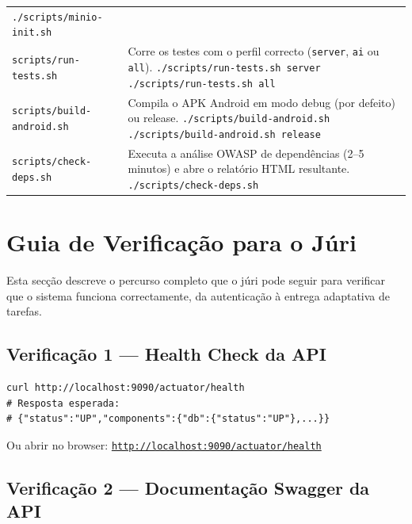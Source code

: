 \documentclass[12pt,a4paper]{article}
\newcommand{\cmd}[1]{\texttt{\small\color{accent}#1}}
\begin{document}
\begin{center}
\begin{tabularx}{\textwidth}{lX}
  \texttt{./scripts/minio-init.sh} \\[0.5em]
\cmd{scripts/run-tests.sh} &
  Corre os testes com o perfil correcto (\texttt{server}, \texttt{ai} ou \texttt{all}).\newline
  \texttt{./scripts/run-tests.sh server} \quad \texttt{./scripts/run-tests.sh all} \\[0.5em]
\cmd{scripts/build-android.sh} &
  Compila o APK Android em modo debug (por defeito) ou release.\newline
  \texttt{./scripts/build-android.sh} \quad \texttt{./scripts/build-android.sh release} \\[0.5em]
\cmd{scripts/check-deps.sh} &
  Executa a análise OWASP de dependências (2--5 minutos) e abre o relatório HTML resultante.\newline
  \texttt{./scripts/check-deps.sh} \\
\bottomrule
\end{tabularx}
\end{center}

\section{Guia de Verificação para o Júri}

Esta secção descreve o percurso completo que o júri pode seguir para verificar que o sistema funciona correctamente, da autenticação à entrega adaptativa de tarefas.

\subsection{Verificação 1 — Health Check da API}

\begin{lstlisting}[style=bash]
curl http://localhost:9090/actuator/health
# Resposta esperada:
# {"status":"UP","components":{"db":{"status":"UP"},...}}
\end{lstlisting}

Ou abrir no browser: \href{http://localhost:9090/actuator/health}{\texttt{http://localhost:9090/actuator/health}}

\subsection{Verificação 2 — Documentação Swagger da API}
\end{document}
